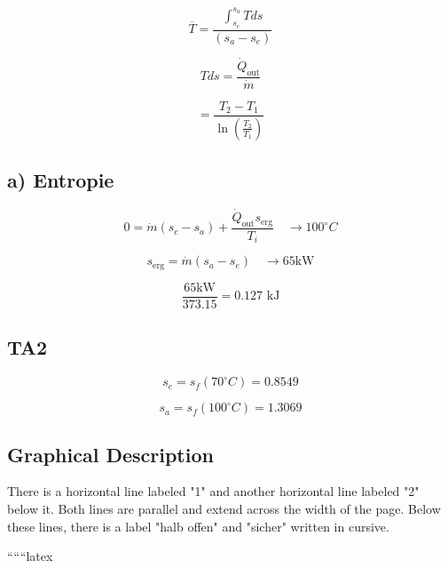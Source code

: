 \[
\overline{T} = \frac{\int_{s_e}^{s_a} T ds}{(s_a - s_e)}
\]

\[
T ds = \frac{\dot{Q}_{\text{out}}}{\dot{m}}
\]

\[
= \frac{T_2 - T_1}{\ln \left( \frac{T_2}{T_1} \right)}
\]


\subsection*{a) Entropie}

\[
0 = \dot{m} (s_c - s_a) + \frac{\dot{Q}_{\text{out}} s_{\text{erg}}}{T_i} \quad \rightarrow 100^\circ C
\]

\[
s_{\text{erg}} = \dot{m} (s_a - s_e) \quad \rightarrow 65 \text{kW}
\]

\[
\frac{65 \text{kW}}{373.15} = 0.127 \text{ kJ}
\]

\subsection*{TA2}

\[
s_e = s_f (70^\circ C) = 0.8549
\]

\[
s_a = s_f (100^\circ C) = 1.3069
\]

\subsection*{Graphical Description}

There is a horizontal line labeled "1" and another horizontal line labeled "2" below it. Both lines are parallel and extend across the width of the page. Below these lines, there is a label "halb offen" and "sicher" written in cursive.

``````latex


